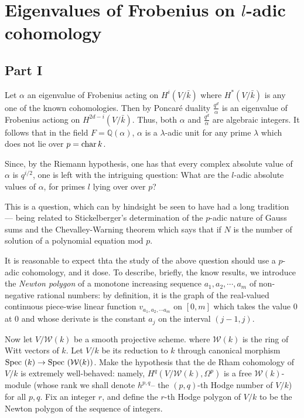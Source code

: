 \section{Eigenvalues of Frobenius on $l$-adic cohomology}
\subsection{Part I}
	Let $\alpha$ an eigenvalue of Frobenius acting on $H^i(V/\bar{k})$ where $H^*(V/\bar{k})$ is any one of the known cohomologies. Then by Poncar\'e duality $\frac{q^d}{\alpha}$ is an eigenvalue of Frobenius actiong on $H^{2d-i}(V/\bar{k})$. Thus, both $\alpha$ and $\frac{q^d}{\alpha}$ are algebraic integers. It follows that in the field $F= \mathbb{Q}(\alpha)$, $\alpha$ is a $\lambda$-adic unit for any prime $\lambda$ which does not lie over $p= \operatorname{char} k$.
	
	Since, by the Riemann hypothesis, one has that every complex absolute value of $\alpha$ is $q^{i/2}$, one is left with the intriguing question: What are the $l$-adic absolute values of $\alpha$, for primes $l$ lying over over $p$?
	
	This is a question, which can by hindsight be seen to have had a long tradition --- being related to Stickelberger's determination of the $p$-adic nature of Gauss sums and the Chevalley-Warning theorem which says that if $N$ is the number of solution of a polynomial equation $\text{mod } p$.
	
	It is reasonable to expect thta the study of the above question should use a $p$-adic cohomology, and it dose. To describe, briefly, the know results, we introduce the \emph{Newton polygon} of a monotone increasing sequence $a_1, a_2, \cdots, a_m$ of non-negative rational numbers: by definition, it is the graph of the real-valued continuous piece-wise linear function $v_{a_1, a_2, \cdots a_m}$ on $[0,m]$ which takes the value $0$ at $0$ and whose derivate is the constant $a_j$ on the interval $(j-1,j)$.
		
	Now let $V/\mathcal{W}(k)$ be a smooth projective scheme. where $\mathcal{W}(k)$ is the ring of Witt vectors of $k$. Let $V/k$ be its reduction to $k$ through canonical morphism $ \text{Spec } (k) \to \text{Spec }(\mathcal{W}(k))$. Make the hypothesis that the de Rham cohomology of $V/k$ is extremely well-behaved: namely, $H^q(V/\mathcal{W}(k), \Omega^p)$ is a free $\mathcal{W}(k)$-module (whose rank we shall denote $h^{p,q}$-- the $(p,q)$-th Hodge number of $V/k$) for all $p,q$. Fix an integer $r$, and define the $r$-th Hodge polygon of $V/k$ to be the Newton polygon of the sequence of integers. 